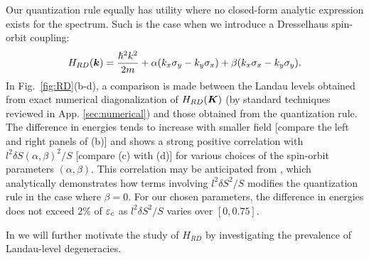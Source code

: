 \documentclass[aps, prb, showpacs, twocolumn, notitlepage, superscriptaddress]{revtex4-1}
\begin{document}
Our quantization rule equally has utility where no closed-form analytic expression exists for the spectrum. Such is the case when we introduce a Dresselhaus spin-orbit coupling:
\begin{equation}
 H_{RD}(\bk)=\frac{{\hbar^2}k^2}{2m}+\alpha(k_{x}\sigma_{y}-k_{y}\sigma_{x})+\beta(k_{x}\sigma_{x}-k_{y}\sigma_{y}).\la{hamRD}
\end{equation}
In Fig.\ \ref{fig:RD}(b-d), a comparison is made between the Landau levels obtained from exact numerical diagonalization of $H_{RD}(\boldsymbol{K})$ (by standard techniques reviewed in App. \ref{sec:numerical}) and those obtained from the quantization rule. The difference in energies tends to increase with smaller field [compare the left and right panels of   (b)] and shows a strong positive correlation with $l^2\delta S(\alpha,\beta)^2/S$ [compare (c) with (d)] for various choices of the spin-orbit parameters $(\alpha,\beta)$. This correlation may be anticipated from , which analytically demonstrates how terms involving $l^2\delta S^2/S$ modifies the quantization rule in the case where $\beta{=}0$. For our chosen parameters,  the difference in energies does not exceed $2\%$ of $\varepsilon_c$ as $l^2\delta S^2/S$ varies over $[0,0.75]$.



In  we will further motivate the study of $H_{RD}$ by investigating the prevalence of Landau-level degeneracies. 



\end{document}
